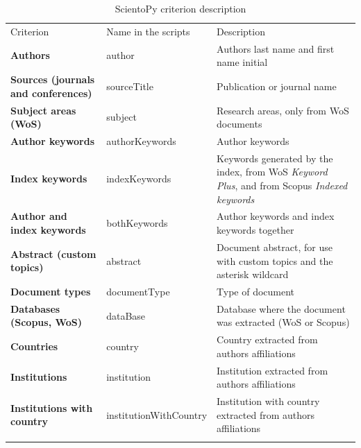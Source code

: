 \documentclass[10pt,letterpaper]{article}
\begin{document}
\begin{table}[h]
	\centering
	\caption{ScientoPy criterion description}
	\label{table_criterion}

	\renewcommand{\arraystretch}{1.5}
	\begin{tabular}{p{4.6cm} p{3.6cm} p{8cm}}
	\hline\noalign{\smallskip}
	Criterion       & Name in the scripts & Description                             \\
	\noalign{\smallskip}\hline\noalign{\smallskip}
	\textbf{Authors}         & author & Authors last name and first name initial                                                                       \\
	\textbf{Sources (journals and conferences)}    & sourceTitle & Publication or journal name                                                         \\
	\textbf{Subject areas (WoS)}        & subject & Research areas, only from WoS documents                                                             \\
	\textbf{Author keywords} & authorKeywords & Author keywords                                                                                        \\
	\textbf{Index keywords}  & indexKeywords & Keywords generated by the index, from WoS \textit{Keyword Plus}, and from Scopus \textit{Indexed keywords} \\
	\textbf{Author and index keywords}   & bothKeywords & Author keywords and index keywords together                                                \\
	\textbf{Abstract (custom topics)}       & abstract & Document abstract, for use with custom topics and the asterisk wildcard\\
	\textbf{Document types}   & documentType & Type of document                                                                                      \\
	\textbf{Databases (Scopus, WoS)}       & dataBase & Database where the document was extracted (WoS or Scopus)                                    \\
	\textbf{Countries}        & country & Country extracted from authors affiliations                                                                 \\
	\textbf{Institutions}    & institution & Institution extracted from authors affiliations                                                          \\
	\textbf{Institutions with country}    & institutionWithCountry & Institution with country extracted from authors affiliations                     \\
	\noalign{\smallskip}\hline
	\end{tabular}

\end{table}
\end{document}
